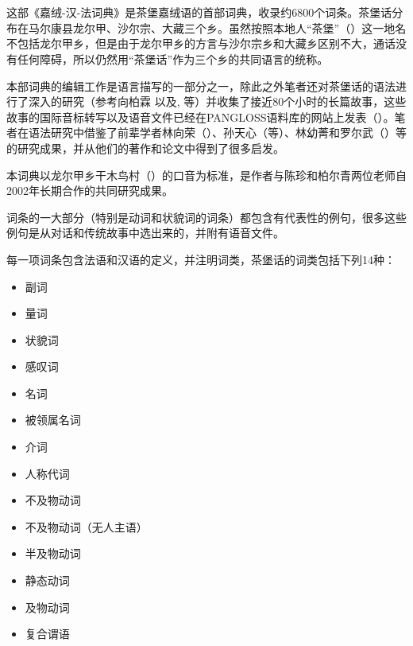 
\cn
\section*{}

这部《嘉绒-汉-法词典》是茶堡嘉绒语的首部词典，收录约6800个词条。茶堡话分布在马尔康县龙尔甲、沙尔宗、大藏三个乡。虽然按照本地人“茶堡”（）这一地名不包括龙尔甲乡，但是由于龙尔甲乡的方言与沙尔宗乡和大藏乡区别不大，通话没有任何障碍，所以仍然用“茶堡话”作为三个乡的共同语言的统称。

本部词典的编辑工作是语言描写的一部分之一，除此之外笔者还对茶堡话的语法进行了深入的研究（参考向柏霖 \citeyear{jacques08}以及\citealt{jacques12incorp, jacques13tropative, jacques14antipassive,  jacques15spontaneous}, \citeyear{jacques15causative, jacques16relatives}等）并收集了接近80个小时的长篇故事，这些故事的国际音标转写以及语音文件已经在PANGLOSS语料库的网站上发表（\citealt{michailovsky14pangloss}）。笔者在语法研究中借鉴了前辈学者林向荣（\citeyear{linxr93jiarong}）、孙天心（\citeyear{jackson00sidaba, jackson04zhuangmaoci, jackson06paisheng, jackson14morpho}等）、林幼菁和罗尔武（\citeyear{linluo03}）等的研究成果，并从他们的著作和论文中得到了很多启发。


本词典以龙尔甲乡干木鸟村（）的口音为标准，是作者与陈珍和柏尔青两位老师自2002年长期合作的共同研究成果。

词条的一大部分（特别是动词和状貌词的词条）都包含有代表性的例句，很多这些例句是从对话和传统故事中选出来的，并附有语音文件。

每一项词条包含法语和汉语的定义，并注明词类，茶堡话的词类包括下列14种：

\begin{itemize}
\item {} 副词
\item {} 量词
\item {} 状貌词
\item {} 感叹词
\item {} 名词
\item {} 被领属名词
\item {} 介词
\item {} 人称代词
\item {} 不及物动词
\item {} 不及物动词（无人主语）
\item {} 半及物动词
\item {} 静态动词
\item {} 及物动词
\item {} 复合谓语
\end{itemize}

